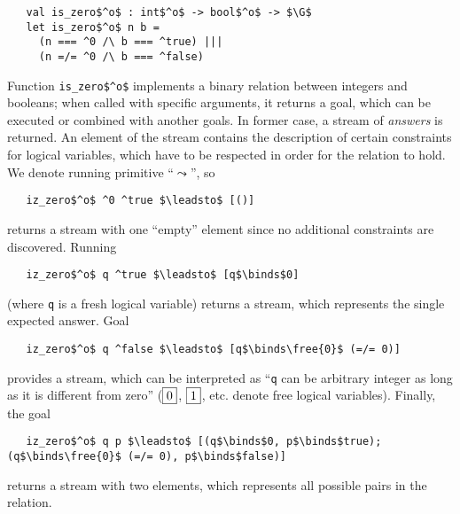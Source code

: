 \begin{lstlisting}
   val is_zero$^o$ : int$^o$ -> bool$^o$ -> $\G$
   let is_zero$^o$ n b = 
     (n === ^0 /\ b === ^true) |||
     (n =/= ^0 /\ b === ^false)
\end{lstlisting}

Function \lstinline|is_zero$^o$| implements a binary relation between integers and booleans; when called with specific arguments, it returns a goal, which can be executed or combined with another goals. In former case, a stream of \emph{answers} is returned. An element of the stream contains the description of certain constraints for logical variables, which have to be respected in order for the relation to hold. We denote running primitive ``$\leadsto$'', so

\begin{lstlisting}
   iz_zero$^o$ ^0 ^true $\leadsto$ [()]
\end{lstlisting}

\noindent returns a stream with one ``empty'' element since no additional constraints are discovered. 
Running 

\begin{lstlisting}
   iz_zero$^o$ q ^true $\leadsto$ [q$\binds$0]
\end{lstlisting}

\noindent (where \lstinline|q| is a fresh logical variable) returns a stream, which represents the single expected answer. Goal

\begin{lstlisting}
   iz_zero$^o$ q ^false $\leadsto$ [q$\binds\free{0}$ (=/= 0)]
\end{lstlisting}

\noindent provides a stream, which can be interpreted as ``\lstinline|q| can be arbitrary integer as long as it is different from zero'' ($\boxed{0}$, $\boxed{1}$, etc. denote free logical variables). Finally, the goal

\begin{lstlisting}
   iz_zero$^o$ q p $\leadsto$ [(q$\binds$0, p$\binds$true); (q$\binds\free{0}$ (=/= 0), p$\binds$false)]
\end{lstlisting}

\noindent returns a stream with two elements, which represents all possible pairs in the relation.

